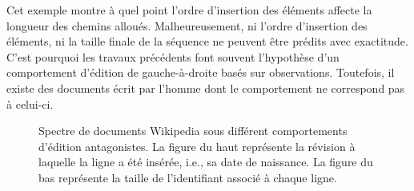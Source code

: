 Cet exemple montre à quel point l'ordre d'insertion des éléments affecte la
longueur des chemins alloués. Malheureusement, ni l'ordre d'insertion des
éléments, ni la taille finale de la séquence ne peuvent être prédits avec
exactitude. C'est pourquoi les travaux précédents font souvent l'hypothèse d'un
comportement d'édition de gauche-à-droite basés sur observations. Toutefois, il
existe des documents écrit par l'homme dont le comportement ne correspond pas à
celui-ci.

\begin{figure}
  \centering
  \hspace{10pt}
  \caption{\label{fig:allocation}Spectre de documents Wikipedia sous différent
    comportements d'édition antagonistes. La figure du haut représente la
    révision à laquelle la ligne a été insérée, i.e., sa date de naissance.  La
    figure du bas représente la taille de l'identifiant associé à chaque ligne.}
\end{figure}

